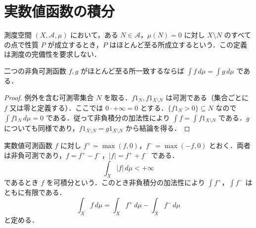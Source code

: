 \section{実数値函数の積分}
\begin{defn}[ほとんど至る所]
測度空間 $(X,\mathcal A,\mu)$ において，ある $N\in\mathcal A$，$\mu(N)=0$ に対し $X\setminus N$ のすべての点で性質 $P$ が成立するとき，$P$ はほとんど至る所成立するという．この定義は測度の完備性を要求しない．
\end{defn}
\begin{prop}[非負積分の零集合上での不変性]
二つの非負可測函数 $f,g$ がほとんど至る所一致するならば $\int f\,d\mu=\int g\,d\mu$ である．
\end{prop}
\begin{proof}
例外を含む可測零集合 $N$ を取る．$f1_N,f1_{X\setminus N}$ は可測である（集合ごとに $f$ 又は零と定義する）．ここでは $0\cdot+\infty=0$ とする．$\{f1_N>0\}\subseteq N$ なので $\int f1_N\,d\mu=0$ である．従って非負積分の加法性により $\int f=\int f1_{X\setminus N}$ である．$g$ についても同様であり，$f1_{X\setminus N}=g1_{X\setminus N}$ から結論を得る．
\end{proof}
\begin{defn}[実可積分函数]
実数値可測函数 $f$ に対し $f^+=\max(f,0)$，$f^-=\max(-f,0)$ とおく．両者は非負可測であり，$f=f^+-f^-$，$|f|=f^++f^-$ である．
\[
 \int_X |f|\,d\mu<+\infty
\]
であるとき $f$ を可積分という．このとき非負積分の加法性により $\int f^+$，$\int f^-$ はともに有限である．
\[
 \int_X f\,d\mu=\int_X f^+\,d\mu-\int_X f^-\,d\mu
\]
と定める．
\end{defn}
